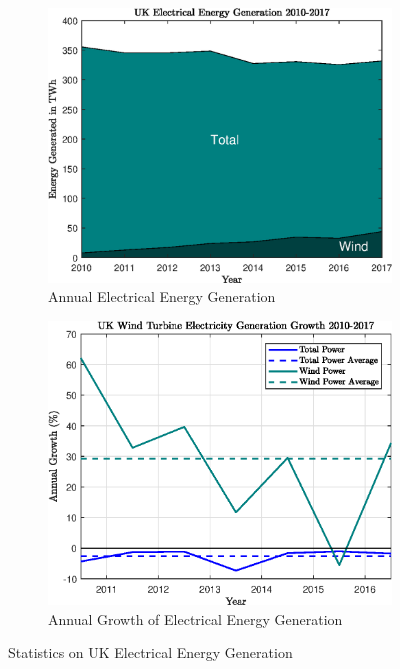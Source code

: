 \documentclass[11pt]{article}
\begin{document}
\begin{figure}[ht] 
        \centering
        \begin{subfigure}[b]{0.475\textwidth}
            \centering
            \includegraphics[width=\textwidth]{ukGen}
            \caption[Network2]%
            {{\small Annual Electrical Energy Generation }}    
            \label{fig:zoommesh1}
        \end{subfigure}
        \hfill
        \begin{subfigure}[b]{0.475\textwidth}  
            \centering 
            \includegraphics[width=\textwidth]{WindGrowth}
            \caption[]%
            {{\small Annual Growth of Electrical Energy Generation  }}    
            \label{fig:WindGrowth}
        \end{subfigure}
        \caption[ The Effect of Mesh Size on Temperature Resolution ]
        {\small Statistics on UK Electrical Energy Generation} 
        \label{fig:ukenergy}
    \end{figure}
\end{document}
